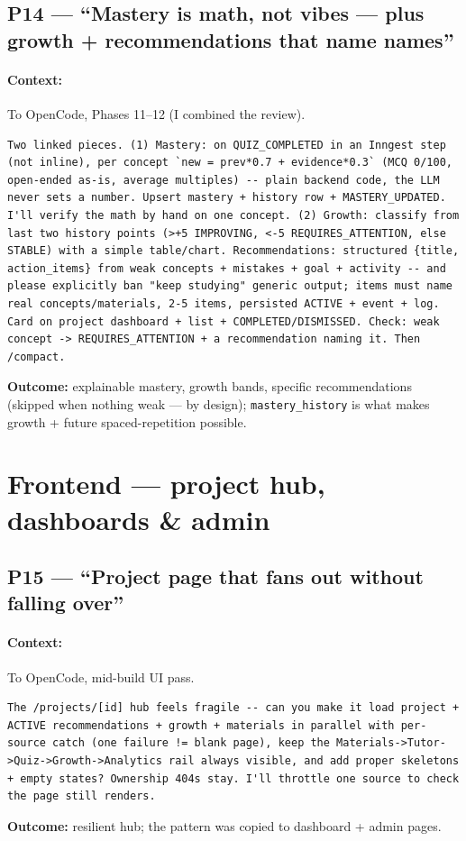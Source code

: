\documentclass[11pt,a4paper]{article}
\begin{document}
\subsection{P14 --- ``Mastery is math, not vibes --- plus growth + recommendations that name names''}
\paragraph{Context:} To OpenCode, Phases 11--12 (I combined the review).
\begin{lstlisting}
Two linked pieces. (1) Mastery: on QUIZ_COMPLETED in an Inngest step (not inline), per concept `new = prev*0.7 + evidence*0.3` (MCQ 0/100, open-ended as-is, average multiples) -- plain backend code, the LLM never sets a number. Upsert mastery + history row + MASTERY_UPDATED. I'll verify the math by hand on one concept. (2) Growth: classify from last two history points (>+5 IMPROVING, <-5 REQUIRES_ATTENTION, else STABLE) with a simple table/chart. Recommendations: structured {title, action_items} from weak concepts + mistakes + goal + activity -- and please explicitly ban "keep studying" generic output; items must name real concepts/materials, 2-5 items, persisted ACTIVE + event + log. Card on project dashboard + list + COMPLETED/DISMISSED. Check: weak concept -> REQUIRES_ATTENTION + a recommendation naming it. Then /compact.
\end{lstlisting}
\textbf{Outcome:} explainable mastery, growth bands, specific recommendations (skipped when nothing weak --- by design); \texttt{mastery\_history} is what makes growth + future spaced-repetition possible.

\section{Frontend --- project hub, dashboards \& admin}

\subsection{P15 --- ``Project page that fans out without falling over''}
\paragraph{Context:} To OpenCode, mid-build UI pass.
\begin{lstlisting}
The /projects/[id] hub feels fragile -- can you make it load project + ACTIVE recommendations + growth + materials in parallel with per-source catch (one failure != blank page), keep the Materials->Tutor->Quiz->Growth->Analytics rail always visible, and add proper skeletons + empty states? Ownership 404s stay. I'll throttle one source to check the page still renders.
\end{lstlisting}
\textbf{Outcome:} resilient hub; the pattern was copied to dashboard + admin pages.
\end{document}
